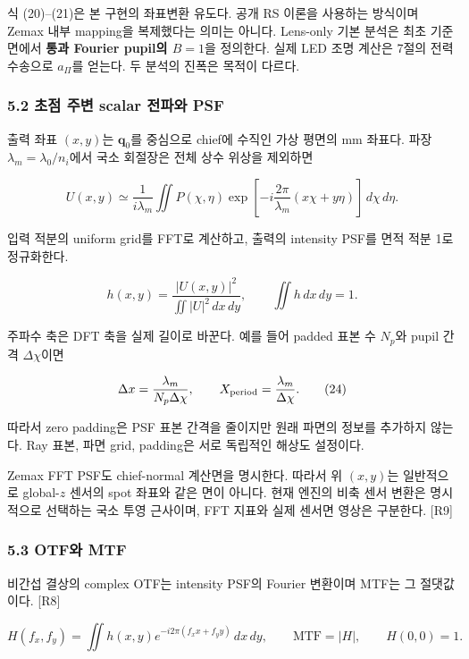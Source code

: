 \documentclass[
  a4paper,
]{article}
\begin{document}
식 (20)--(21)은 본 구현의 좌표변환 유도다. 공개 RS 이론을 사용하는
방식이며 Zemax 내부 mapping을 복제했다는 의미는 아니다. Lens-only 기본
분석은 최초 기준면에서 \textbf{통과 Fourier pupil의 \(B=1\)}을 정의한다.
실제 LED 조명 계산은 7절의 전력 수송으로 \(a_\Pi\)를 얻는다. 두 분석의
진폭은 목적이 다르다.

\hypertarget{uxcd08uxc810-uxc8fcuxbcc0-scalar-uxc804uxd30cuxc640-psf}{%
\subsubsection{5.2 초점 주변 scalar 전파와
PSF}\label{uxcd08uxc810-uxc8fcuxbcc0-scalar-uxc804uxd30cuxc640-psf}}

출력 좌표 \((x,y)\)는 \(\mathbf q_0\)를 중심으로 chief에 수직인 가상
평면의 mm 좌표다. 파장 \(\lambda_m=\lambda_0/n_i\)에서 국소 회절장은
전체 상수 위상을 제외하면

\[
U(x,y)\simeq\frac{1}{i\lambda_m}
 \iint P(\chi,\eta)
 \exp\left[-i\frac{2\pi}{\lambda_m}(x\chi+y\eta)\right]
 \,d\chi\,d\eta.
\tag{22}
\]

입력 적분의 uniform grid를 FFT로 계산하고, 출력의 intensity PSF를 면적
적분 1로 정규화한다.

\[
h(x,y)=\frac{|U(x,y)|^2}{\iint|U|^2\,dx\,dy},\qquad
\iint h\,dx\,dy=1.
\tag{23}
\]

주파수 축은 DFT 축을 실제 길이로 바꾼다. 예를 들어 padded 표본 수
\(N_p\)와 pupil 간격 \(\Delta\chi\)이면

\[
\Delta x=\frac{\lambda_m}{N_p\Delta\chi},\qquad
X_{\rm period}=\frac{\lambda_m}{\Delta\chi}.
\tag{24}
\]

따라서 zero padding은 PSF 표본 간격을 줄이지만 원래 파면의 정보를
추가하지 않는다. Ray 표본, 파면 grid, padding은 서로 독립적인 해상도
설정이다.

Zemax FFT PSF도 chief-normal 계산면을 명시한다. 따라서 위 \((x,y)\)는
일반적으로 global-\(z\) 센서의 spot 좌표와 같은 면이 아니다. 현재 엔진의
비축 센서 변환은 명시적으로 선택하는 국소 투영 근사이며, FFT 지표와 실제
센서면 영상은 구분한다. {[}R9{]}

\hypertarget{otfuxc640-mtf}{%
\subsubsection{5.3 OTF와 MTF}\label{otfuxc640-mtf}}

비간섭 결상의 complex OTF는 intensity PSF의 Fourier 변환이며 MTF는 그
절댓값이다. {[}R8{]}

\[
H(f_x,f_y)=\iint h(x,y)e^{-i2\pi(f_xx+f_yy)}\,dx\,dy,
\qquad \mathrm{MTF}=|H|,\qquad H(0,0)=1.
\tag{25}
\]
\end{document}
